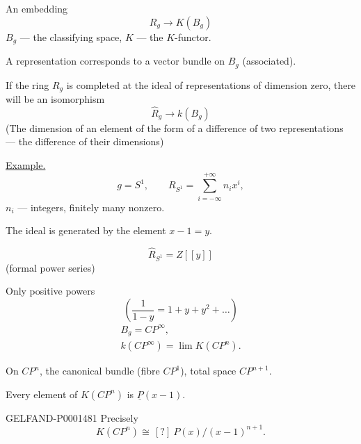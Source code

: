 An embedding
\begin{equation*}
R_g\longrightarrow K (B_g)
\end{equation*}
$B_g$ — the classifying space,
$K$ — the $K$-functor.

A representation corresponds to a vector bundle on $B_g$ (associated).

If the ring $R_g$ is completed at the ideal of representations of dimension zero, there will be an isomorphism
\begin{equation*}
\widehat R_g\longrightarrow k (B_g)
\end{equation*}
(The dimension of an element of the form of a difference of two representations — the difference of their dimensions)

\underline{Example.}
\begin{equation*}
g=S^1,\qquad R_{S^1}=\sum_{i=-\infty}^{+\infty}n_i x^i,
\end{equation*}
$n_i$ — integers, finitely many nonzero.

The ideal is generated by the element $x-1=y$.

\begin{equation*}
\widehat R_{S^1}=Z[[y]]
\end{equation*}
(formal power series)

Only positive powers
\begin{equation*}
\left (\frac1{1-y}=1+y+y^2+\ldots\right)
\end{equation*}
\begin{gather*}
B_g=CP^\infty,\\
k (CP^\infty)=\lim K (CP^n).
\end{gather*}

On $CP^n$, the canonical bundle (fibre $CP^1$), total space $CP^{n+1}$.

Every element of $K (CP^n)$ is $\underline{P}(x-1)$.

\begin{GelfandAdjacentEvidence}{GELFAND-P000148}{1}
Precisely
\begin{equation*}
K (CP^n)\cong\, [?]\ P (x)/(x-1)^{n+1}.
\end{equation*}
\end{GelfandAdjacentEvidence}

